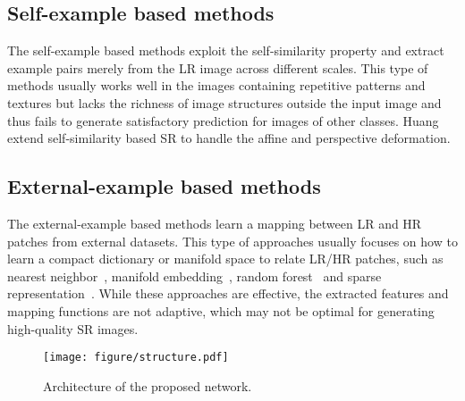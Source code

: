 \documentclass[10pt,twocolumn,letterpaper]{article}
\begin{document}
\subsection{Self-example based methods}

The self-example based methods exploit the self-similarity property and extract example pairs merely from the LR image across different scales. This type of methods usually works well in the images containing repetitive patterns and textures but lacks the richness of image structures outside the input image and thus fails to generate satisfactory prediction for images of other classes. Huang \etal~\cite{Urban100} extend self-similarity based SR to handle the affine and perspective deformation.

\subsection{External-example based methods}

The external-example based methods learn a mapping between LR and HR patches from external datasets. This type of approaches usually focuses on how to learn a compact dictionary or manifold space to relate LR/HR patches, such as nearest neighbor~\cite{NN}, manifold embedding~\cite{manifold_embedding}, random forest~\cite{random_forest} and sparse representation~\cite{sparse_coding,sparse_coding_TIP}. While these approaches are effective, the extracted features and mapping functions are not adaptive, which may not be optimal for generating high-quality SR images.

\begin{figure*}[htb]
	\begin{center}
		\texttt{[image: figure/structure.pdf]}
	\end{center}
	\caption{Architecture of the proposed network.}
	\label{fig:structure}
\end{figure*}
\end{document}
